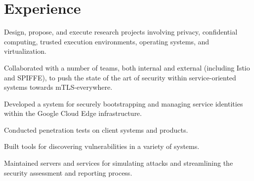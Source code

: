 \documentclass{resume}
\begin{document}
\hfill
\begin{minipage}[t]{0.66\textwidth}


\section{Experience}

\vspace{1.25\topsep} %
\begin{tightemize}
\item Design, propose, and execute research projects involving privacy, confidential computing, trusted execution environments, operating systems, and virtualization.
\end{tightemize}
\sectionsep

\begin{tightemize}
\item Collaborated with a number of teams, both internal and external (including Istio and SPIFFE), to push the state of the art of security within service-oriented systems towards mTLS-everywhere.
\item Developed a system for securely bootstrapping and managing service identities within the Google Cloud Edge infrastructure.
\end{tightemize}
\sectionsep

\begin{tightemize}
\item Conducted penetration tests on client systems and products.
\item Built tools for discovering vulnerabilities in a variety of systems.
\item Maintained servers and services for simulating attacks and streamlining the security assessment and reporting process.
\end{tightemize}
\sectionsep


\end{minipage}
\end{document}
